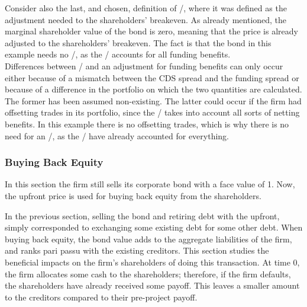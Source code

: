 \documentclass[main.tex]{subfiles}
\begin{document}
            Consider also the last, and chosen, definition of \FVA/,
            where it was defined as the adjustment needed to the shareholders' breakeven.
            As already mentioned, the marginal shareholder value of the bond is zero,
            meaning that the price is already adjusted to the shareholders' breakeven.
            The fact is that the bond in this example needs no \FVA/,
            as the \DVA/ accounts for all funding benefits.
            \\
            Differences between \DVA/ and an adjustment for funding benefits can only occur 
            either because of a mismatch between the CDS spread and the funding spread
            or because of a difference in the portfolio on which the two quantities are calculated. 
            The former has been assumed non-existing.
            The latter could occur if the firm had offsetting trades in its portfolio,
            since the \FVA/ takes into account all sorts of netting benefits.
            In this example there is no offsetting trades, 
            which is why there is no need for an \FVA/, as the \DVA/ have already accounted for everything.

        \subsubsection{Buying Back Equity}
            In this section the firm still sells its corporate bond with a face value of \num{1}.
            Now, the upfront price is used for buying back equity from the shareholders. 

            In the previous section, selling the bond and retiring debt with the upfront,
            simply corresponded to exchanging some existing debt for some other debt. 
            When buying back equity, the bond value adds to the aggregate liabilities of the firm, 
            and ranks pari passu with the existing creditors.
            This section studies the beneficial impacts on the firm's shareholders of doing this transaction.
            At time 0, the firm allocates some cash to the shareholders;
            therefore, if the firm defaults, the shareholders have already received some payoff.
            This leaves a smaller amount to the creditors compared to their pre-project payoff.
\end{document}
